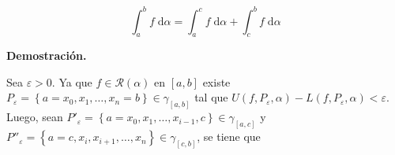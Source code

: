 \documentclass[fleqn, 12pt]{article}
\newcommand{\rsi}[1]{\mathcal{R}(#1)}
\begin{document}
	\begin{equation*}
		\int_{a}^{b} f \; \mathrm{d} \alpha = \int_{a}^{c} f \; \mathrm{d} \alpha + \int_{c}^{b} f \; \mathrm{d} \alpha
	\end{equation*}

	\textbf{Demostración.}

	Sea $ \varepsilon > 0 $. Ya que $ f \in \rsi{\alpha} $ en $ [a,b] $ existe $ P_\varepsilon = \left\lbrace a = x_0, x_1, \ldots, x_n = b \right\rbrace \in \gamma_{[a,b]} $ tal que $ U(f,P_\varepsilon,\alpha) - L(f,P_\varepsilon,\alpha) < \varepsilon $. Luego, sean $ P'_\varepsilon = \left\lbrace a = x_0, x_1, \ldots, x_{i-1}, c \right\rbrace \in \gamma_{[a,c]} $ y $ P''_\varepsilon = \left\lbrace a = c, x_i, x_{i+1}, \ldots, x_n \right\rbrace \in \gamma_{[c,b]} $, se tiene que
\end{document}
